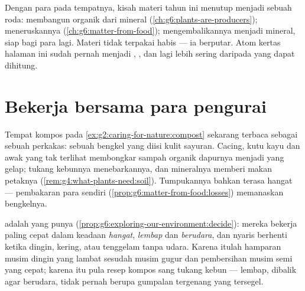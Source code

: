 \begin{remark}\label{rem:g6:decomposers-and-soil:circle}
Dengan para  pada tempatnya, kisah materi tahun ini menutup
menjadi sebuah roda:  membangun organik dari mineral
(\cref{ch:g6:plants-are-producers});  meneruskannya
(\cref{ch:g6:matter-from-food});  mengembalikannya menjadi
mineral, siap bagi para  lagi. Materi tidak terpakai habis ---
ia berputar. Atom kertas halaman ini sudah pernah menjadi , ,
 dan  lagi lebih sering daripada yang dapat dihitung.
\end{remark}

\section{Bekerja bersama para pengurai}

\begin{example}\label{ex:g6:decomposers-and-soil:compost}
Tempat kompos pada \cref{ex:g2:caring-for-nature:compost} sekarang
terbaca sebagai sebuah perkakas: sebuah bengkel  yang diisi
kulit sayuran. Cacing, kutu kayu dan awak yang tak terlihat membongkar
sampah organik dapurnya menjadi  yang gelap; tukang kebunnya
menebarkannya, dan mineralnya memberi makan petaknya
(\cref{rem:g4:what-plants-need:soil}). Tumpukannya bahkan terasa
hangat --- pembakaran para  sendiri
(\cref{prop:g6:matter-from-food:losses}) memanaskan bengkelnya.
\end{example}

\begin{proposition}\label{prop:g6:decomposers-and-soil:speed}
 adalah  yang punya 
(\cref{prop:g6:exploring-our-environment:decide}): mereka bekerja
paling cepat dalam keadaan \emph{hangat}, \emph{lembap} dan
\emph{berudara}, dan nyaris berhenti ketika dingin, kering, atau
tenggelam tanpa udara. Karena itulah hamparan musim dingin yang lambat
sesudah musim gugur dan pembersihan musim semi yang cepat; karena itu
pula resep kompos sang tukang kebun --- lembap, dibalik agar berudara,
tidak pernah berupa gumpalan tergenang yang tersegel.
\end{proposition}
\admitted

